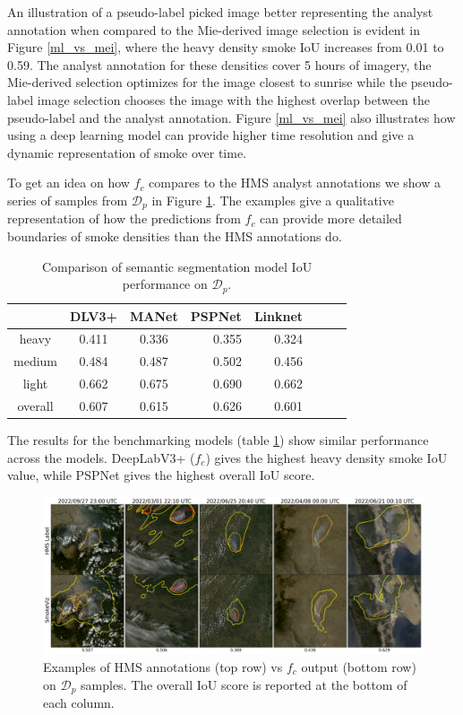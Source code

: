 \documentclass{article}
\begin{document}
An illustration of a pseudo-label picked image better representing the analyst annotation when compared to the Mie-derived image selection is evident in Figure \ref{ml_vs_mei}, where the heavy density smoke IoU increases from 0.01 to 0.59. The analyst annotation for these densities cover 5 hours of imagery, the Mie-derived selection optimizes for the image closest to sunrise while the pseudo-label image selection chooses the image with the highest overlap between the pseudo-label and the analyst annotation. Figure \ref{ml_vs_mei} also illustrates how using a deep learning model can provide higher time resolution and give a dynamic representation of smoke over time.

To get an idea on how \(f_{c}\) compares to the HMS analyst annotations we show a series of samples from \(\mathcal{D}_{p}\) in Figure \ref{bench}. The examples give a qualitative representation of how the predictions from \(f_c\) can provide more detailed boundaries of smoke densities than the HMS annotations do.

\begin{table}[h]
    \caption{Comparison of semantic segmentation model IoU performance on \(\mathcal{D}_{p}\).}\label{bench}
    \centering
    \begin{tabular}{cccrrcrc}
        \toprule
           & DLV3+ & MANet & PSPNet & Linknet \\
        \midrule
        heavy   & 0.411 & 0.336  & 0.355 & 0.324 \\
        medium  & 0.484 & 0.487  & 0.502 & 0.456 \\
        light   & 0.662 & 0.675  & 0.690 & 0.662 \\
        overall & 0.607 & 0.615  & 0.626 & 0.601 \\
        \bottomrule
    \end{tabular}
\end{table}

The results for the benchmarking models (table \ref{bench}) show similar performance across the models. DeepLabV3+ (\(f_c\)) gives the highest heavy density smoke IoU value, while PSPNet gives the highest overall IoU score.

\begin{figure}[!htb]
    \centering
    \includegraphics[width=\linewidth]{figures/examples_small.png}
    \caption{Examples of HMS annotations (top row) vs \(f_{c}\) output (bottom row) on \(\mathcal{D}_{p}\) samples. The overall IoU score is reported at the bottom of each column.}\label{examples}
\end{figure}
\end{document}
